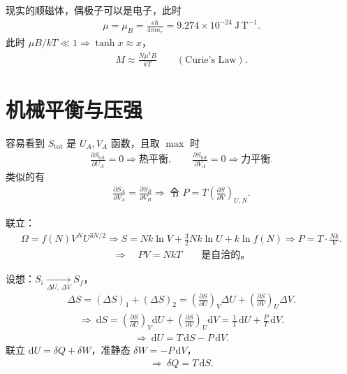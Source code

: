 现实的顺磁体，偶极子可以是电子，此时
\begin{align}
\mu=\mu_B=\frac{e\hbar}{4\pi m_e}=9.274\times 10^{-24}\ \mathrm{J\,T^{-1}}.
\end{align}
此时 $\mu B/kT\ll 1\Rightarrow \tanh x\approx x$，
\begin{align}
M\approx \frac{N\mu^2B}{kT}\qquad (\text{Curie's Law}).
\end{align}

\section{机械平衡与压强}
容易看到 $S_{\mathrm{tot}}$ 是 $U_A,V_A$ 函数，且取 $\max$ 时
\begin{align}
\frac{\partial S_{\mathrm{tot}}}{\partial U_A}=0\Rightarrow \text{热平衡},
\qquad
\frac{\partial S_{\mathrm{tot}}}{\partial V_A}=0\Rightarrow \text{力平衡}.
\end{align}
类似的有
\begin{align}
\frac{\partial S_A}{\partial V_A}=\frac{\partial S_B}{\partial V_B}
\Rightarrow\ \text{令 }P=T\left(\frac{\partial S}{\partial V}\right)_{U,N}.
\end{align}

联立：
\begin{align}
\Omega=f(N)V^NU^{3N/2}
\Rightarrow S=Nk\ln V+\frac{3}{2}Nk\ln U+k\ln f(N)
\Rightarrow P=T\cdot\frac{Nk}{V}.
\end{align}
\begin{align}
\Rightarrow\quad PV=NkT\qquad \text{是自洽的。}
\end{align}

设想：$S_i\xrightarrow[\Delta U,\,\Delta V]{}S_f$，
\begin{align}
\Delta S=(\Delta S)_1+(\Delta S)_2
=\left(\frac{\partial S}{\partial U}\right)_V\Delta U+\left(\frac{\partial S}{\partial V}\right)_U\Delta V.
\end{align}
\begin{align}
\Rightarrow\ \mathrm{d}S
=\left(\frac{\partial S}{\partial U}\right)_V\mathrm{d}U+\left(\frac{\partial S}{\partial V}\right)_U\mathrm{d}V
=\frac{1}{T}\,\mathrm{d}U+\frac{P}{T}\,\mathrm{d}V.
\end{align}
\begin{align}
\Rightarrow\ \mathrm{d}U=T\,\mathrm{d}S-P\,\mathrm{d}V.
\end{align}
联立 $\mathrm{d}U=\delta Q+\delta W$，准静态 $\delta W=-P\,\mathrm{d}V$，
\begin{align}
\Rightarrow\ \delta Q=T\,\mathrm{d}S.
\end{align}

